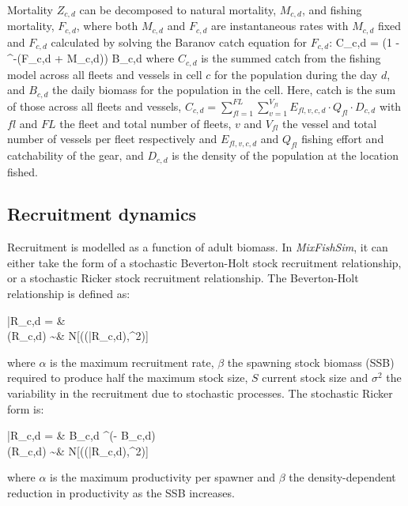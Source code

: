 \documentclass[preprint]{elsarticle}
\let\oldequation\equation
\let\oldendequation\endequation
\renewenvironment{equation}
 {\linenomathNonumbers\oldequation}
 {\oldendequation\endlinenomath}
\begin{document}
Mortality $Z_{c,d}$ can be decomposed to natural mortality, $M_{c,d}$, and
fishing mortality, $F_{c,d}$, where both $M_{c,d}$ and $F_{c,d}$ are
instantaneous rates with $M_{c,d}$ fixed and $F_{c,d}$ calculated by solving
the Baranov catch equation \citep{Hilborn1992b} for $F_{c,d}$:
\begin{equation}
C_{c,d} =  \cdot \left(1 -
	^{-(F_{c,d} + M_{c,d})}\right) \cdot B_{c,d}
\end{equation}
where $C_{c,d}$ is the summed catch from the fishing model across all fleets
and vessels in cell $c$ for the population during the day $d$, and $B_{c,d}$
the daily biomass for the population in the cell. Here, catch is the sum of
those across all fleets and vessels, $C_{c, d} =
\sum\limits_{fl=1}^{FL}\sum\limits_{v=1}^{V_{fl}} E_{fl, v, c, d} \cdot Q_{fl}
\cdot D_{c, d}$ with $fl$ and $FL$ the fleet and total number of fleets, $v$
and $V_{fl}$ the vessel and total number of vessels per fleet respectively and
$E_{fl,v,c,d}$ and $Q_{fl}$ fishing effort and catchability of the gear, and
$D_{c,d}$ is the density of the population at the location fished. \\

\subsection{Recruitment dynamics}

Recruitment is modelled as a function of adult biomass. In
\textit{MixFishSim}, it can either take the form of a stochastic Beverton-Holt
stock recruitment relationship, or a stochastic Ricker stock recruitment
relationship. The Beverton-Holt relationship is defined as\citep{Beverton1957}: 
\begin{equation}
	\begin{split}
	\bar{R}_{c,d} = &  \\
	     \ln(R_{c,d}) \sim & N[(\ln(\bar{R}_{c,d}),\sigma^2)]
	\end{split}
\end{equation}
where $\alpha$ is the maximum recruitment rate, $\beta$ the spawning stock
biomass (SSB) required to produce half the maximum stock size, $S$ current
stock size and $\sigma^2$ the variability in the recruitment due to stochastic
processes. The stochastic Ricker form \citep{Ricker1954} is:
\begin{equation}
	\begin{split}
	\bar{R}_{c,d} = & B_{c,d} \cdot {}^{(\alpha - \beta \cdot B_{c,d})} \\	
	\ln(R_{c,d}) \sim & N[(\ln(\bar{R}_{c,d}),\sigma^2)]
	\end{split}
\end{equation}
where $\alpha$ is the maximum productivity per spawner and $\beta$ the
density-dependent reduction in productivity as the SSB increases. 
\end{document}
